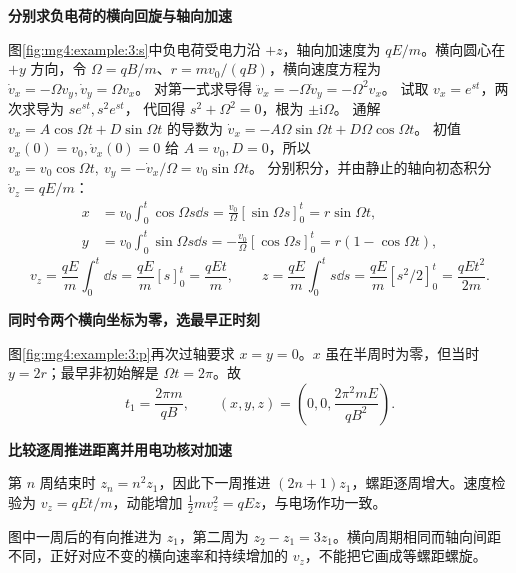 \begin{solution}\textbf{分别求负电荷的横向回旋与轴向加速}\par\nobreak
图\ref{fig:mg4:example:3:s}中负电荷受电力沿 $+z$，轴向加速度为 $qE/m$。横向圆心在 $+y$ 方向，令 $\Omega=qB/m$、$r=mv_0/(qB)$，横向速度方程为 $\dot v_x=-\Omega v_y,\dot v_y=\Omega v_x$。
对第一式求导得 $\ddot v_x=-\Omega\dot v_y=-\Omega^2v_x$。
试取 $v_x=e^{st}$，两次求导为 $se^{st},s^2e^{st}$，
代回得 $s^2+\Omega^2=0$，根为 $\pm\mathrm i\Omega$。
通解 $v_x=A\cos\Omega t+D\sin\Omega t$ 的导数为
$\dot v_x=-A\Omega\sin\Omega t+D\Omega\cos\Omega t$。
初值 $v_x(0)=v_0,\dot v_x(0)=0$ 给 $A=v_0,D=0$，所以
$v_x=v_0\cos\Omega t,\ v_y=-\dot v_x/\Omega=v_0\sin\Omega t$。
分别积分，并由静止的轴向初态积分 $\dot v_z=qE/m$：
\[
 \begin{aligned}
 x&=v_0\int_0^t\cos\Omega s\dd s
   =\frac{v_0}{\Omega}[\sin\Omega s]_0^t=r\sin\Omega t,\\
 y&=v_0\int_0^t\sin\Omega s\dd s
   =-\frac{v_0}{\Omega}[\cos\Omega s]_0^t=r(1-\cos\Omega t),
 \end{aligned}
\]
\[
 v_z=\frac{qE}{m}\int_0^t\dd s=\frac{qE}{m}[s]_0^t=\frac{qEt}{m},\qquad
 z=\frac{qE}{m}\int_0^t s\dd s=\frac{qE}{m}[s^2/2]_0^t
 =\frac{qEt^2}{2m}.
\]



\par\medskip{}\noindent\textbf{同时令两个横向坐标为零，选最早正时刻}\par\nobreak
图\ref{fig:mg4:example:3:p}再次过轴要求 $x=y=0$。$x$ 虽在半周时为零，但当时 $y=2r$；最早非初始解是 $\Omega t=2\pi$。故
\[
t_1=\frac{2\pi m}{qB},\qquad (x,y,z)=\left(0,0,\frac{2\pi^2mE}{qB^2}\right).
\]


\par\medskip{}\noindent\textbf{比较逐周推进距离并用电功核对加速}\par\nobreak
第 $n$ 周结束时 $z_n=n^2z_1$，因此下一周推进 $(2n+1)z_1$，螺距逐周增大。速度检验为 $v_z=qEt/m$，动能增加 $\tfrac12mv_z^2=qEz$，与电场作功一致。

图中一周后的有向推进为 $z_1$，第二周为 $z_2-z_1=3z_1$。横向周期相同而轴向间距不同，正好对应不变的横向速率和持续增加的 $v_z$，不能把它画成等螺距螺旋。\end{solution}
